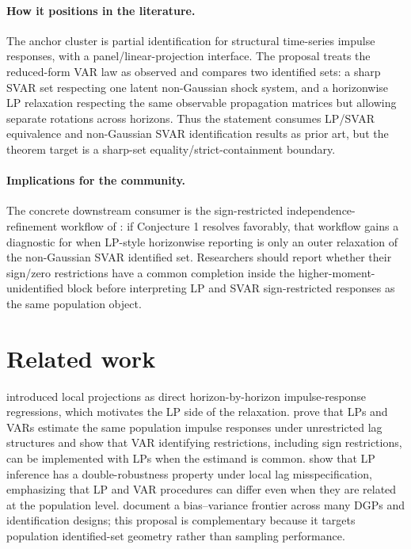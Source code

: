 \documentclass[11pt]{article}
\theoremstyle{definition}
\theoremstyle{plain}
\theoremstyle{remark}
\begin{document}
\paragraph{How it positions in the literature.}
The anchor cluster is partial identification for structural time-series impulse responses, with a panel/linear-projection interface.  The proposal treats the reduced-form VAR law as observed and compares two identified sets: a sharp SVAR set respecting one latent non-Gaussian shock system, and a horizonwise LP relaxation respecting the same observable propagation matrices but allowing separate rotations across horizons.  Thus the statement consumes LP/SVAR equivalence and non-Gaussian SVAR identification results as prior art, but the theorem target is a sharp-set equality/strict-containment boundary.

\paragraph{Implications for the community.}
The concrete downstream consumer is the sign-restricted independence-refinement workflow of \citet{DrautzburgWright2023}: if Conjecture 1 resolves favorably, that workflow gains a diagnostic for when LP-style horizonwise reporting is only an outer relaxation of the non-Gaussian SVAR identified set.  Researchers should report whether their sign/zero restrictions have a common completion inside the higher-moment-unidentified block before interpreting LP and SVAR sign-restricted responses as the same population object.

\section{Related work}
\citet{Jorda2005} introduced local projections as direct horizon-by-horizon impulse-response regressions, which motivates the LP side of the relaxation.  \citet{PlagborgMollerWolf2021} prove that LPs and VARs estimate the same population impulse responses under unrestricted lag structures and show that VAR identifying restrictions, including sign restrictions, can be implemented with LPs when the estimand is common.  \citet{MontielOleaPlagborgMollerQianWolf2024} show that LP inference has a double-robustness property under local lag misspecification, emphasizing that LP and VAR procedures can differ even when they are related at the population level.  \citet{LiPlagborgMollerWolf2024} document a bias--variance frontier across many DGPs and identification designs; this proposal is complementary because it targets population identified-set geometry rather than sampling performance.
\end{document}
